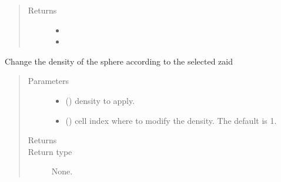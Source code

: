 \documentclass[letterpaper,10pt,english]{sphinxmanual}
\begin{document}
\begin{fulllineitems}
\begin{fulllineitems}
\begin{quote}
\begin{description}
\begin{itemize}
\end{itemize}

\item[{Returns}] \leavevmode
\begin{itemize}
\item {} 

\item {} 

\end{itemize}


\end{description}\end{quote}

\end{fulllineitems}


\begin{fulllineitems}
\label{\detokenize{api/inputgeneration:inputfile.InputFile.change_density}}
Change the density of the sphere according to the selected zaid
\begin{quote}\begin{description}
\item[{Parameters}] \leavevmode\begin{itemize}
\item {} 
 () \textendash{} density to apply.

\item {} 
 (\sphinxstyleliteralemphasis{\sphinxupquote{, }}) \textendash{} cell index where to modify the density. The default is 1.

\end{itemize}

\item[{Returns}] \leavevmode


\item[{Return type}] \leavevmode
None.

\end{description}\end{quote}


\end{fulllineitems}
\end{fulllineitems}
\end{document}
